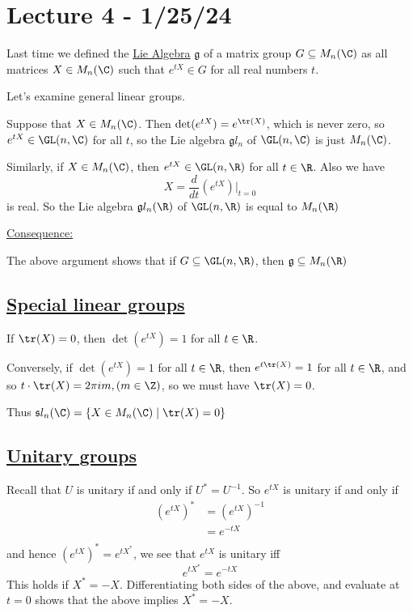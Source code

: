 \documentclass[x11names,reqno,14pt]{extarticle}
\newcommand{\mk}[1]{\mathfrak{#1}}
\newcommand{\dd}[2]{\frac{d#1}{d#2}}
\begin{document}
\section*{Lecture 4 - 1/25/24}

Last time we defined the \underline{Lie Algebra} $\mk{g}$ of a matrix group $G \subseteq M_n(\C)$ as all matrices $X \in M_n(\C)$ such that $e^{tX} \in G$ for all real numbers $t$. 

\exm

Let's examine general linear groups. 

Suppose that $X \in M_n(\C)$. Then $\det(e^{tX}) = e^{\tr(X)}$, which is never zero, so $e^{tX}\in\GL(n,\C)$ for all $t$, so the Lie algebra $\mk{g}l_n$ of $\GL(n,\C)$ is just $M_n(\C)$.

Similarly, if $X \in M_n(\C)$, then $e^{tX} \in \GL(n,\R)$ for all $t \in \R$. Also we have
\[
X = \dd{}{t}(e^{tX})|_{t=0}
\]
is real. So the Lie algebra $\mk{g}l_n(\R)$ of $\GL(n,\R)$ is equal to $M_n(\R)$

\underline{Consequence:}

The above argument shows that if $G \subseteq \GL(n,\R)$, then $\mk{g}\subseteq M_n(\R)$

\subsection*{\underline{Special linear groups}}

If $\tr(X) =0$, then $\det(e^{tX}) = 1$ for all $t \in \R$. 

Conversely, if $\det(e^{tX}) = 1$ for all $t \in \R$, then $e^{t\tr(X)} = 1$ for all $t \in \R$, and so $t \cdot\tr(X) = 2\pi i m, (m\in\Z)$, so we must have $\tr(X) = 0$.

Thus $\mk{s}l_n(\C) = \{X \in M_n(\C) \mid \tr(X) =0\}$

\subsection*{\underline{Unitary groups}}

Recall that $U$ is unitary if and only if $U^* = U^{-1}$. So $e^{tX}$ is unitary if and only if
\begin{align*}
(e^{tX})^{*} & = (e^{tX})^{-1} \\
				  & = e^{-tX} \\
\end{align*}
and hence $(e^{tX})^* = e^{tX^*}$, we see that $e^{tX}$ is unitary iff
\[
e^{tX^*} = e^{-tX}
\]
This holds if $X^* = -X$. Differentiating both sides of the above,  and evaluate at $t = 0$ shows that the above implies $X^* = -X$. 
\end{document}
